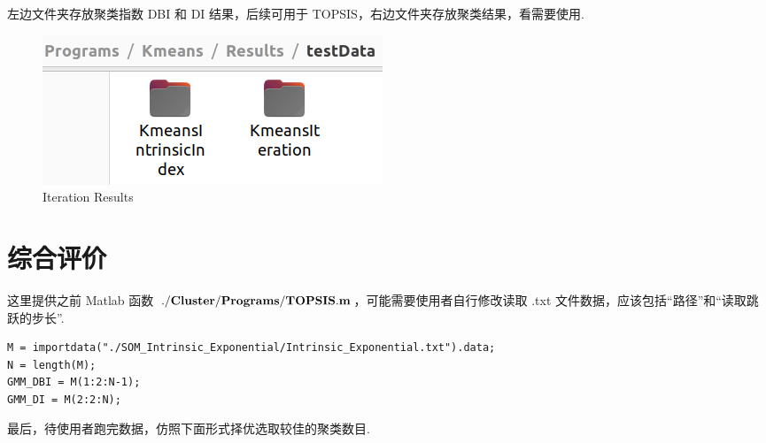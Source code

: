\documentclass[oneside,UTF8]{article}
\numberwithin{figure}{section}
\numberwithin{table}{section}
\numberwithin{equation}{section}
\begin{document}
左边文件夹存放聚类指数 DBI 和 DI 结果，后续可用于 TOPSIS，右边文件夹存放聚类结果，看需要使用.
\begin{figure}[H]
	\centering
	\includegraphics*[scale=0.3]{./images/testDataSubFileFoldaer.png}
	\caption{Iteration Results}
\end{figure}



\section{综合评价}
这里提供之前 Matlab 函数 $\rm\bf{./Cluster/Programs/TOPSIS.m}$，可能需要使用者自行修改读取 .txt 文件数据，应该包括“路径”和“读取跳跃的步长”.

\lstset{language=Matlab}
\begin{lstlisting}
M = importdata("./SOM_Intrinsic_Exponential/Intrinsic_Exponential.txt").data;
N = length(M);
GMM_DBI = M(1:2:N-1);
GMM_DI = M(2:2:N);
\end{lstlisting}

最后，待使用者跑完数据，仿照下面形式择优选取较佳的聚类数目.
\end{document}
